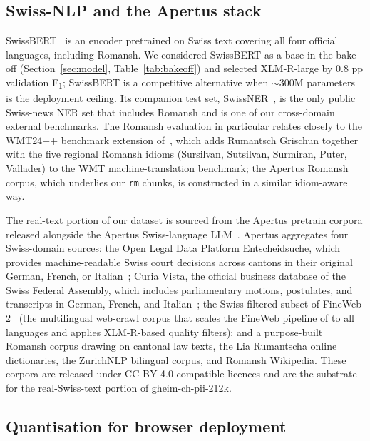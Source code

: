 \documentclass[sigconf,nonacm]{acmart}
\begin{document}
\subsection{Swiss-NLP and the Apertus stack}

\textsf{SwissBERT}~\cite{vamvas2023swissbert} is an encoder
pretrained on Swiss text covering all four official languages,
including Romansh. We considered SwissBERT as a base in the bake-off
(Section~\ref{sec:model}, Table~\ref{tab:bakeoff}) and selected
XLM-R-large by 0.8 pp validation F\textsubscript{1}; SwissBERT is a
competitive alternative when ${\sim}$300M parameters is the
deployment ceiling. Its companion test
set, \textsf{SwissNER}~\cite{vamvas2023swissner}, is the only public
Swiss-news NER set that includes Romansh and is one of our
cross-domain external benchmarks. The Romansh evaluation in particular
relates closely to the \textsf{WMT24++} benchmark
extension of~\citet{vamvas2025romansh_wmt}, which adds Rumantsch
Grischun together with the five regional Romansh idioms (Sursilvan,
Sutsilvan, Surmiran, Puter, Vallader) to the WMT machine-translation
benchmark; the Apertus Romansh corpus, which underlies our
\texttt{rm} chunks, is constructed in a similar idiom-aware way.

The real-text portion of our dataset is sourced from the Apertus
pretrain corpora released alongside the Apertus Swiss-language
LLM~\cite{apertus2025}. Apertus aggregates four Swiss-domain sources:
the Open Legal Data Platform \textsf{Entscheidsuche}, which provides
machine-readable Swiss court decisions across cantons in their
original German, French, or Italian~\cite{entscheidsuche2025};
\textsf{Curia Vista}, the official business database of the Swiss
Federal Assembly, which includes parliamentary motions, postulates,
and transcripts in German, French, and Italian~\cite{curiavista2024};
the Swiss-filtered subset of FineWeb-2~\cite{penedo2025fineweb2} (the
multilingual web-crawl corpus that scales the FineWeb pipeline of
\citet{penedo2024fineweb} to all languages and applies XLM-R-based
quality filters); and a purpose-built Romansh corpus drawing on
cantonal law texts, the Lia Rumantscha online dictionaries, the
ZurichNLP bilingual corpus, and Romansh Wikipedia. These corpora
are released under CC-BY-4.0-compatible licences and are the
substrate for the real-Swiss-text portion of \textsf{gheim-ch-pii-212k}.

\subsection{Quantisation for browser deployment}
\end{document}
